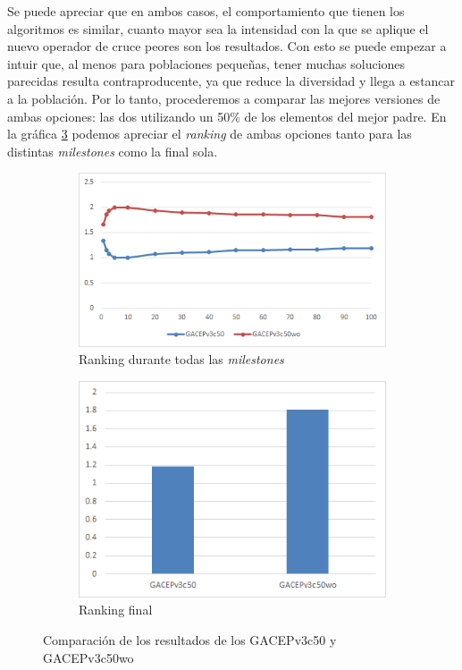 Se puede apreciar que en ambos casos, el comportamiento que tienen los algoritmos es similar, cuanto mayor sea la intensidad con la que se aplique el nuevo operador de cruce peores son los resultados. 
Con esto se puede empezar a intuir que, al menos para poblaciones pequeñas, tener muchas soluciones parecidas resulta contraproducente, ya que reduce la diversidad y llega a estancar a la población. 
Por lo tanto, procederemos a comparar las mejores versiones de ambas opciones: las dos utilizando un 50\% de los elementos del mejor padre. 
En la gráfica \ref{fig:GACEPv3c} podemos apreciar el \textit{ranking} de ambas opciones tanto para las distintas \textit{milestones} como la final sola.

\begin{figure}[h]
     \centering
     \begin{subfigure}[b]{0.45\textwidth}
         \centering
         \includegraphics[width=\textwidth]{imagenes/Experimental/GACEPv3c.png}
         \caption{Ranking durante todas las \textit{milestones}}
         \label{fig:GACEPv3c_lineas}
     \end{subfigure}
     \hfill
     \begin{subfigure}[b]{0.45\textwidth}
         \centering
         \includegraphics[width=\textwidth]{imagenes/Experimental/barras/GACEPv3c.png}
         \caption{Ranking final}
         \label{fig:GACEPv3c_barras}
     \end{subfigure}
        \caption{Comparación de los resultados de los GACEPv3c50 y GACEPv3c50wo}
        \label{fig:GACEPv3c}
\end{figure}

